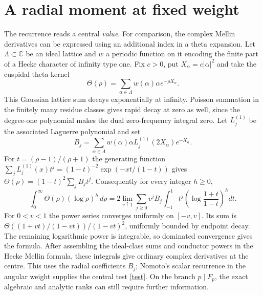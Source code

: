 \documentclass[11pt]{article}
\begin{document}
\section{A radial moment at fixed weight}
The recurrence reads a central \emph{value}. For comparison, the complex Mellin derivatives can be expressed using an additional index in a theta expansion. Let $\Lambda\subset\mathbb C$ be an ideal lattice and $w$ a periodic function on it encoding the finite part of a Hecke character of infinity type one. Fix $c>0$, put $X_\alpha=c|\alpha|^2$ and take the cuspidal theta kernel
\[
 \Theta(\rho)=\sum_{\alpha\in\Lambda}w(\alpha)\alpha e^{-\rho X_\alpha}.
\]
This Gaussian lattice sum decays exponentially at infinity. Poisson summation in the finitely many residue classes gives rapid decay at zero as well, since the degree-one polynomial makes the dual zero-frequency integral zero. Let $L_j^{(1)}$ be the associated Laguerre polynomial and set
\[
 B_j=\sum_{\alpha\in\Lambda}w(\alpha)\alpha L_j^{(1)}(2X_\alpha)e^{-X_\alpha}.
\]
For $t=(\rho-1)/(\rho+1)$ the generating function
$\sum_jL_j^{(1)}(x)t^j=(1-t)^{-2}\exp(-xt/(1-t))$ gives $\Theta(\rho)=(1-t)^2\sum_jB_jt^j$. Consequently for every integer $h\ge0$,
\[
 \int_0^\infty\Theta(\rho)(\log\rho)^h\,d\rho
 =2\lim_{v\uparrow1}\sum_{j\ge0}v^jB_j
 \int_{-1}^1 t^j\left(\log\frac{1+t}{1-t}\right)^h dt .
\]
For $0<v<1$ the power series converges uniformly on $[-v,v]$. Its sum is $\Theta((1+vt)/(1-vt))/(1-vt)^2$, uniformly bounded by endpoint decay. The remaining logarithmic power is integrable, so dominated convergence gives the formula. After assembling the ideal-class sums and conductor powers in the Hecke Mellin formula, these integrals give ordinary complex derivatives at the centre. This uses the radial coefficients $B_j$; Nomoto's scalar recurrence in the angular weight supplies the central test \eqref{test}. On the branch $p\mid F_p$, the exact algebraic and analytic ranks can still require further information.
\end{document}
